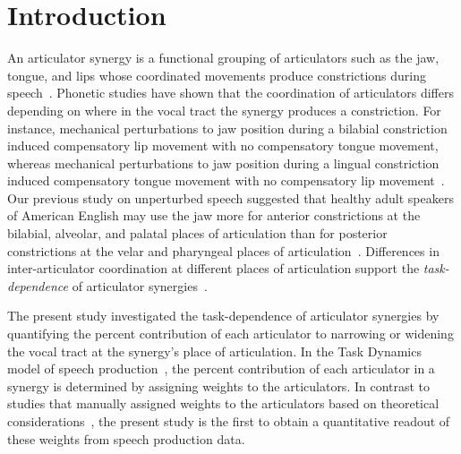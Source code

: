 \documentclass[preprint]{JASAnew}\usepackage[]{graphicx}\usepackage[]{color}
\begin{document}
\maketitle


\section{Introduction}

An articulator synergy is a functional grouping of articulators such as the jaw, tongue, and lips whose coordinated movements produce constrictions during speech~\cite{turvey1977preliminaries}. 
%
Phonetic studies have shown that the coordination of articulators differs depending on where in the vocal tract the synergy produces a constriction. 
%
For instance, mechanical perturbations to jaw position during a bilabial constriction induced compensatory lip movement with no compensatory tongue movement, 
%
whereas mechanical perturbations to jaw position during a lingual constriction induced compensatory tongue movement with no compensatory lip movement~\citep{kelso1984functionally}. 
%
Our previous study on unperturbed speech suggested that healthy adult speakers of American English may use the jaw more for anterior constrictions at the bilabial, alveolar, and palatal places of articulation than for posterior constrictions at the velar and pharyngeal places of articulation~\citep{Sorensen+2016}. 
%
Differences in inter-articulator coordination at different places of articulation support the \textit{task-dependence} of articulator synergies~\citep{latash2008synergy}. 

The present study investigated the task-dependence of articulator synergies by quantifying the percent contribution of each articulator to narrowing or widening the vocal tract at the synergy's place of articulation. 
%
In the Task Dynamics model of speech production~\citep{saltzman1989dynamical}, the percent contribution of each articulator in a synergy is determined by assigning weights to the articulators. 
%
In contrast to studies that manually assigned weights to the articulators based on theoretical considerations~\citep[for example, see][for an assignment of weights based on articulator mass]{simko2010embodied}, the present study is the first to obtain a quantitative readout of these weights from speech production data. 
\end{document}
